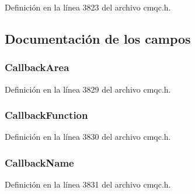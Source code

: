 Definición en la línea 3823 del archivo cmqc.\+h.



\subsection{Documentación de los campos}
\hypertarget{structtag_m_q_c_b_d_aec315c62e18aa72c5d04cadada50f160}{}
\subsubsection[{Callback\+Area}]{ Callback\+Area}\label{structtag_m_q_c_b_d_aec315c62e18aa72c5d04cadada50f160}


Definición en la línea 3829 del archivo cmqc.\+h.

\hypertarget{structtag_m_q_c_b_d_aed9b3cdc59679c9be14dc5dc693f3ac0}{}
\subsubsection[{Callback\+Function}]{ Callback\+Function}\label{structtag_m_q_c_b_d_aed9b3cdc59679c9be14dc5dc693f3ac0}


Definición en la línea 3830 del archivo cmqc.\+h.

\hypertarget{structtag_m_q_c_b_d_a912dafe7212efcbdb457883a53cf7010}{}
\subsubsection[{Callback\+Name}]{ Callback\+Name}\label{structtag_m_q_c_b_d_a912dafe7212efcbdb457883a53cf7010}


Definición en la línea 3831 del archivo cmqc.\+h.

\hypertarget{structtag_m_q_c_b_d_ae3bab36f44b94fe301ca31e17eb7a0e4}{}
